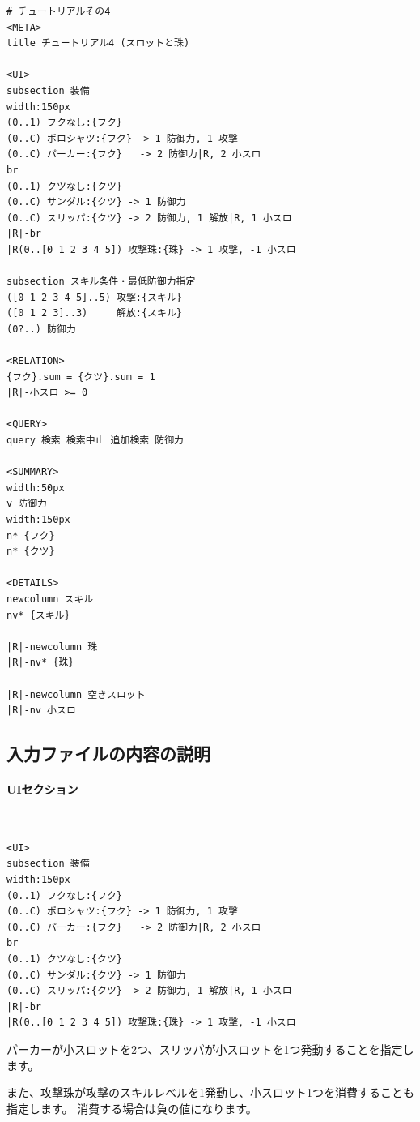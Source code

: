 \documentclass[dvipdfmx]{jsarticle}
\begin{document}
{\footnotesize\begin{mdframed}\begin{Verbatim}[commandchars=|<>]
# チュートリアルその4
<META>
title チュートリアル4 (スロットと珠)

<UI>
subsection 装備
width:150px
(0..1) フクなし:{フク}
(0..C) ポロシャツ:{フク} -> 1 防御力, 1 攻撃
(0..C) パーカー:{フク}   -> 2 防御力|R, 2 小スロ
br
(0..1) クツなし:{クツ}
(0..C) サンダル:{クツ} -> 1 防御力
(0..C) スリッパ:{クツ} -> 2 防御力, 1 解放|R, 1 小スロ
|R|-br
|R(0..[0 1 2 3 4 5]) 攻撃珠:{珠} -> 1 攻撃, -1 小スロ

subsection スキル条件・最低防御力指定
([0 1 2 3 4 5]..5) 攻撃:{スキル}
([0 1 2 3]..3)     解放:{スキル}
(0?..) 防御力

<RELATION>
{フク}.sum = {クツ}.sum = 1
|R|-小スロ >= 0

<QUERY>
query 検索 検索中止 追加検索 防御力

<SUMMARY>
width:50px
v 防御力
width:150px
n* {フク}
n* {クツ}

<DETAILS>
newcolumn スキル
nv* {スキル}

|R|-newcolumn 珠
|R|-nv* {珠}

|R|-newcolumn 空きスロット
|R|-nv 小スロ
\end{Verbatim}
\end{mdframed}}

\subsection{入力ファイルの内容の説明}

\paragraph{UIセクション}~\medskip
{\footnotesize\begin{mdframed}\begin{Verbatim}[commandchars=|<>]
<UI>
subsection 装備
width:150px
(0..1) フクなし:{フク}
(0..C) ポロシャツ:{フク} -> 1 防御力, 1 攻撃
(0..C) パーカー:{フク}   -> 2 防御力|R, 2 小スロ
br
(0..1) クツなし:{クツ}
(0..C) サンダル:{クツ} -> 1 防御力
(0..C) スリッパ:{クツ} -> 2 防御力, 1 解放|R, 1 小スロ
|R|-br
|R(0..[0 1 2 3 4 5]) 攻撃珠:{珠} -> 1 攻撃, -1 小スロ
\end{Verbatim}
\end{mdframed}}
\medskip

パーカーが小スロットを2つ、スリッパが小スロットを1つ発動することを指定します。

また、攻撃珠が攻撃のスキルレベルを1発動し、小スロット1つを消費することも指定します。
消費する場合は負の値になります。
\end{document}
